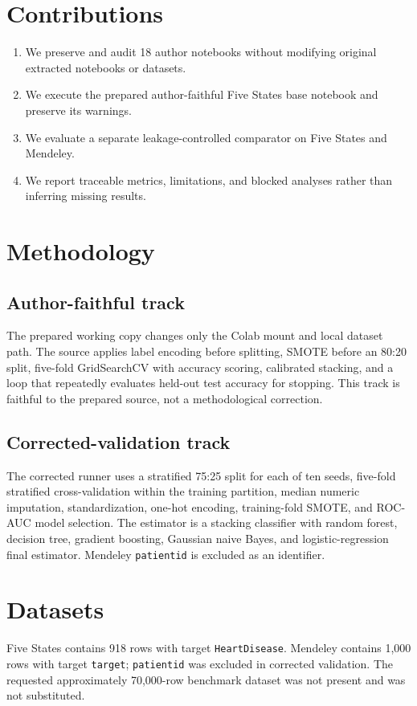 \documentclass[11pt]{article}
\begin{document}
\section{Contributions}
\begin{enumerate}
\item We preserve and audit 18 author notebooks without modifying original extracted notebooks or datasets.
\item We execute the prepared author-faithful Five States base notebook and preserve its warnings.
\item We evaluate a separate leakage-controlled comparator on Five States and Mendeley.
\item We report traceable metrics, limitations, and blocked analyses rather than inferring missing results.
\end{enumerate}

\section{Methodology}
\subsection{Author-faithful track}
The prepared working copy changes only the Colab mount and local dataset path. The source applies label encoding before splitting, SMOTE before an 80:20 split, five-fold GridSearchCV with accuracy scoring, calibrated stacking, and a loop that repeatedly evaluates held-out test accuracy for stopping. This track is faithful to the prepared source, not a methodological correction.

\subsection{Corrected-validation track}
The corrected runner uses a stratified 75:25 split for each of ten seeds, five-fold stratified cross-validation within the training partition, median numeric imputation, standardization, one-hot encoding, training-fold SMOTE, and ROC-AUC model selection. The estimator is a stacking classifier with random forest, decision tree, gradient boosting, Gaussian naive Bayes, and logistic-regression final estimator. Mendeley \texttt{patientid} is excluded as an identifier.

\section{Datasets}
Five States contains 918 rows with target \texttt{HeartDisease}. Mendeley contains 1,000 rows with target \texttt{target}; \texttt{patientid} was excluded in corrected validation. The requested approximately 70,000-row benchmark dataset was not present and was not substituted.
\end{document}
